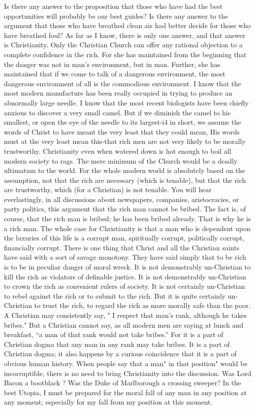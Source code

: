 \documentclass{book}
\begin{document}
Is there any answer to the proposition that those who have had the best opportunities will probably be our best guides? Is there any answer to the argument that those who have breathed clean air had better decide for those who have breathed foul? As far as I know, there is only one answer, and that answer is Christianity. Only the Christian Church can offer any rational objection to a complete confidence in the rich. For she has maintained from the beginning that the danger was not in man’s environment, but in man. Further, she has maintained that if we come to talk of a dangerous environment, the most dangerous environment of all is the commodious environment. I know that the most modern manufacture has been really occupied in trying to produce an abnormally large needle. I know that the most recent biologists have been chiefly anxious to discover a very small camel. But if we diminish the camel to his smallest, or open the eye of the needle to its largest-i4 in short, we assume the words of Christ to have meant the very least that they could mean, His words must at the very least mean this-that rich men are not very likely to be morally trustworthy. Christianity even when watered down is hot enough to boil all modern society to rags. The mere minimum of the Church would be a deadly ultimatum to the world. For the whole modern world is absolutely based on the assumption, not that the rich are necessary (which is tenable), but that the rich are trustworthy, which (for a Christian) is not tenable. You will hear everlastingly, in all discussions about newspapers, companies, aristocracies, or party politics, this argument that the rich man cannot be bribed. The fact is, of course, that the rich man is bribed; he has been bribed already. That is why he is a rich man. The whole case for Christianity is that a man who is dependent upon the luxuries of this life is a corrupt man, spiritually corrupt, politically corrupt, financially corrupt. There is one thing that Christ and all the Christian saints have said with a sort of savage monotony. They have said simply that to be rich is to be in peculiar danger of moral wreck. It is not demonstrably un-Christian to kill the rich as violators of definable justice. It is not demonstrably un-Christian to crown the rich as convenient rulers of society. It is not certainly un-Christian to rebel against the rich or to submit to the rich. But it is quite certainly un-Christian to trust the rich, to regard the rich as more morally safe than the poor. A Christian may consistently say, " I respect that man’s rank, although he takes bribes." But a Christian cannot say, as all modern men are saying at lunch and breakfast, “a man of that rank would not take bribes.” For it is a part of Christian dogma that any man in any rank may take bribes. It is a part of Christian dogma; it also happens by a curious coincidence that it is a part of obvious human history. When people say that a man" in that position" would be incorruptible, there is no need to bring Christianity into the discussion. Was Lord Bacon a bootblack ? Was the Duke of Marlborough a crossing sweeper? In the best Utopia, I must be prepared for the moral fall of any man in any position at any moment; especially for my fall from my position at this moment.
\end{document}
